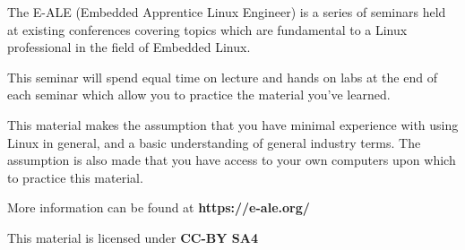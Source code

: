 \alecopyright

\par
The E-ALE (Embedded Apprentice Linux Engineer) is
a series of seminars held at existing conferences covering
topics which are fundamental to a Linux professional in
the field of Embedded Linux.

\par
This seminar will spend equal time on lecture and hands on
labs at the end of each seminar which allow you to practice
the material you've learned.

\begin{lfbox}
   This material makes the assumption that you have minimal
   experience with using Linux in general, and a basic
   understanding of general industry terms.
   The assumption is also made that you have access to your
   own computers upon which to practice this material.
\end{lfbox}

\par
More information can be found at \textbf{https://e-ale.org/}

\par
This material is licensed under \textbf{CC-BY SA4}
